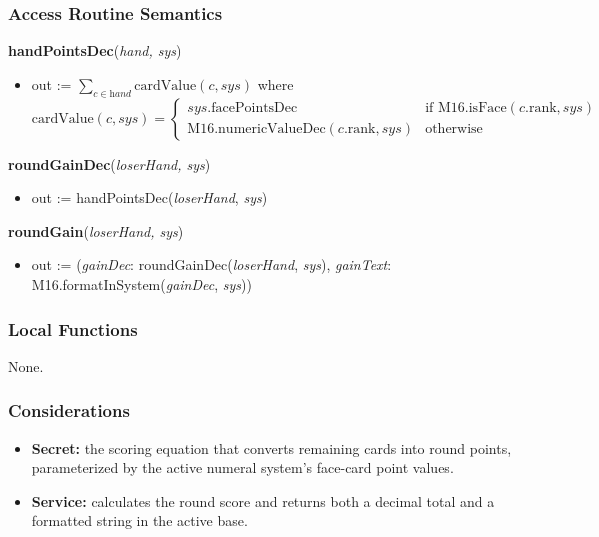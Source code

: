 \documentclass[12pt, titlepage]{article}
\begin{document}
\subsubsection{Access Routine Semantics}

\noindent\textbf{handPointsDec}(\textit{hand, sys})
\begin{itemize}
    \item out := $\displaystyle\sum_{c \in \textit{hand}} \text{cardValue}(c, \textit{sys})$ where
    \[
        \text{cardValue}(c, \textit{sys}) =
        \begin{cases}
        \textit{sys}.\text{facePointsDec} & \text{if } \text{M16.isFace}(c.\text{rank}, \textit{sys}) \\
        \text{M16.numericValueDec}(c.\text{rank}, \textit{sys}) & \text{otherwise}
        \end{cases}
    \]
\end{itemize}

\noindent\textbf{roundGainDec}(\textit{loserHand, sys})
\begin{itemize}
    \item out := handPointsDec(\textit{loserHand}, \textit{sys})
\end{itemize}

\noindent\textbf{roundGain}(\textit{loserHand, sys})
\begin{itemize}
    \item out := (\textit{gainDec}: roundGainDec(\textit{loserHand}, \textit{sys}), \textit{gainText}: M16.formatInSystem(\textit{gainDec}, \textit{sys}))
\end{itemize}

\subsubsection{Local Functions}
None.

\subsubsection{Considerations}
\begin{itemize}
    \item \textbf{Secret:} the scoring equation that converts remaining cards into round points, parameterized by the active numeral system's face-card point values.
    \item \textbf{Service:} calculates the round score and returns both a decimal total and a formatted string in the active base.
\end{itemize}
\end{document}
